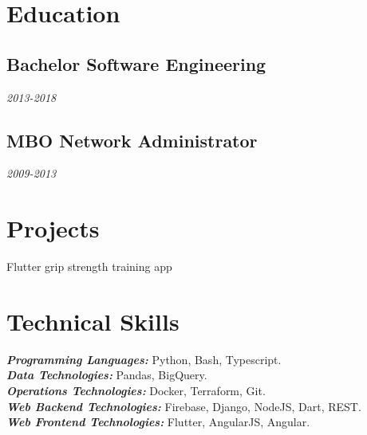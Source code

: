 \documentclass{article}
\begin{document}
\section{Education}
\subsection{Bachelor Software Engineering}\hfill {\em 2013-2018} \\
\subsection{MBO Network Administrator}\hfill {\em 2009-2013} \\


\section{Projects}
Flutter grip strength training app

\section{Technical Skills}

{\sl \textbf{Programming Languages:}} Python, Bash, Typescript. \\
{\sl \textbf{Data Technologies:}} Pandas, BigQuery. \\
{\sl \textbf{Operations Technologies:}} Docker, Terraform, Git. \\
{\sl \textbf{Web Backend Technologies:}} Firebase, Django, NodeJS, Dart, REST. \\
{\sl \textbf{Web Frontend Technologies:}} Flutter, AngularJS, Angular. \\
\end{document}
